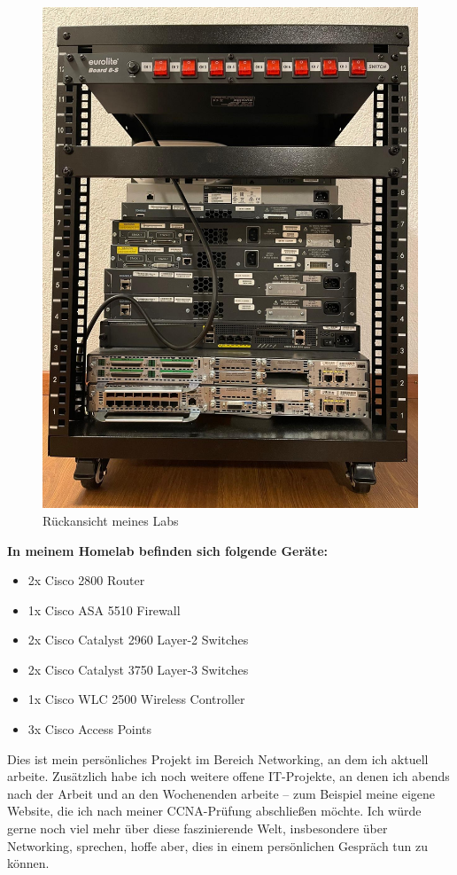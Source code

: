 \documentclass[11pt, a4paper]{awesome-cv}
\begin{document}
\begin{cvletter}
\begin{figure}[h!]
\begin{minipage}{0.48\textwidth}
        \includegraphics[width=\textwidth]{./foto_lab/lab3.jpg}
        \caption{Rückansicht meines Labs}
        \label{fig:lab2}
    \end{minipage}
\end{figure}

\vspace{0.5cm}

\textbf{In meinem Homelab befinden sich folgende Geräte:}
\begin{itemize}
    \item 2x Cisco 2800 Router
    \item 1x Cisco ASA 5510 Firewall
    \item 2x Cisco Catalyst 2960 Layer-2 Switches
    \item 2x Cisco Catalyst 3750 Layer-3 Switches
    \item 1x Cisco WLC 2500 Wireless Controller
    \item 3x Cisco Access Points
\end{itemize}


Dies ist mein persönliches Projekt im Bereich Networking, an dem ich aktuell arbeite. Zusätzlich habe ich noch weitere offene IT-Projekte, an denen ich abends nach der Arbeit und an den Wochenenden arbeite – zum Beispiel meine eigene Website, die ich nach meiner CCNA-Prüfung abschließen möchte. Ich würde gerne noch viel mehr über diese faszinierende Welt, insbesondere über Networking, sprechen, hoffe aber, dies in einem persönlichen Gespräch tun zu können.




\end{cvletter}


\makeletterclosing
\end{document}
